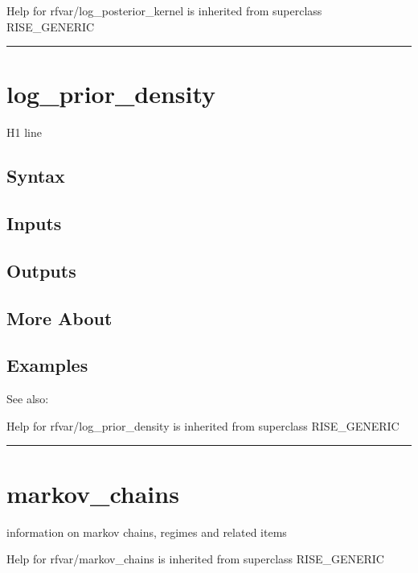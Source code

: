 \documentclass[letterpaper,10pt,english]{sphinxmanual}
\begin{document}
Help for rfvar/log\_posterior\_kernel is inherited from superclass RISE\_GENERIC


\bigskip\hrule{}\bigskip



\section{log\_prior\_density}
\label{classes/models/@rfvar/rfvar:id74}\label{classes/models/@rfvar/rfvar:log-prior-density}
H1 line


\subsection{Syntax}
\label{classes/models/@rfvar/rfvar:id75}

\subsection{Inputs}
\label{classes/models/@rfvar/rfvar:id76}

\subsection{Outputs}
\label{classes/models/@rfvar/rfvar:id77}

\subsection{More About}
\label{classes/models/@rfvar/rfvar:id78}

\subsection{Examples}
\label{classes/models/@rfvar/rfvar:id79}
See also:

Help for rfvar/log\_prior\_density is inherited from superclass RISE\_GENERIC


\bigskip\hrule{}\bigskip



\section{markov\_chains}
\label{classes/models/@rfvar/rfvar:id80}\label{classes/models/@rfvar/rfvar:markov-chains}
information on markov chains, regimes and related items

Help for rfvar/markov\_chains is inherited from superclass RISE\_GENERIC
\end{document}
